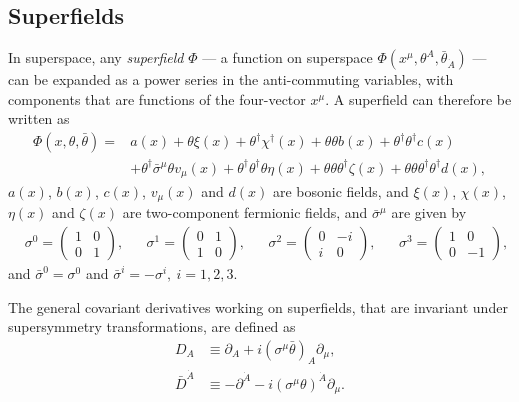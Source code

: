 \documentclass[twoside,english]{uiofysmaster}
\begin{document}
\subsection{Superfields}
In superspace, any \textit{superfield }$\Phi$ --- a function on superspace $\Phi(x^{\mu}, \theta^A, \bar{\theta}_{\dot{A}})$ --- can be expanded as a power series in the anti-commuting variables, with components that are functions of the four-vector $x^{\mu}$. A superfield  can therefore be written as 
\begin{align}\label{Eq:: phys back : Superfield general}
\Phi(x, \theta, \bar{\theta}) =& a(x) + \theta \xi(x) + \theta^{\dagger} \chi^{\dagger}(x) + \theta \theta b(x) + \theta^{\dagger} \theta^{\dagger} c(x)\nonumber \\ &+ \theta^{\dagger} \bar{\sigma}^{\mu} \theta v_{\mu}(x) + \theta^{\dagger} \theta^{\dagger} \theta \eta(x) + \theta \theta \theta^{\dagger} \zeta(x) + \theta \theta \theta^{\dagger} \theta^{\dagger} d(x) , 
\end{align}
$a(x)$, $b(x)$, $c(x)$, $v_{\mu}(x)$ and $d(x)$ are bosonic fields, and $\xi(x)$, $\chi(x)$, $\eta(x)$ and $\zeta(x)$ are two-component fermionic fields, and $\bar{\sigma}^{\mu}$ are given by
\begin{align}
&\sigma^0 =  \begin{pmatrix}
1 & 0\\
0 & 1
\end{pmatrix},
&& \sigma^1 =  \begin{pmatrix}
0 & 1\\
1 & 0
\end{pmatrix},
&& \sigma^2 =  \begin{pmatrix}
0 & -i\\
i & 0
\end{pmatrix},
&& \sigma^3 = \begin{pmatrix}
1 & 0\\
0 & -1
\end{pmatrix},
\end{align}
and $\bar{\sigma}^0 = \sigma^0$ and $\bar{\sigma}^i = -\sigma^i,~i=1,2,3$.

The general covariant derivatives working on superfields, that are invariant under supersymmetry transformations, are defined as
\begin{align}\label{Eq:: phys back : susy covariant derivative D}
D_A & \equiv \partial_A + i (\sigma^{\mu} \bar{\theta})_A \partial_{\mu},\\
\bar{D}^{\dot{A}} & \equiv -\partial^{\dot{A}} - i (\sigma^{\mu} \theta)^{\dot{A}} \partial_{\mu}.\label{Eq:: phys back : susy covariant derivative Dbar}
\end{align}
\end{document}
